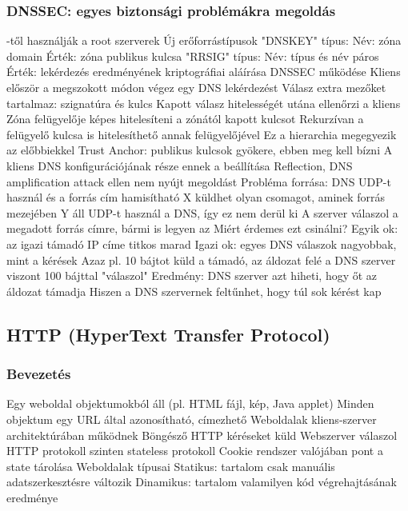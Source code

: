 \documentclass[12pt,a4paper]{article}
\begin{document}
\pagebreak

\subsubsection{DNSSEC: egyes biztonsági problémákra megoldás}

\begin{outline}
	-től használják a root szerverek
	\1 Új erőforrástípusok
		\2 "DNSKEY" típus:
			\3 Név: zóna domain
			\3 Érték: zóna publikus kulcsa
		\2 "RRSIG" típus:
			\3 Név: típus és név páros
			\3 Érték: lekérdezés eredményének kriptográfiai aláírása
	\1 DNSSEC működése
		\2 Kliens először a megszokott módon végez egy DNS lekérdezést
			\3 Válasz extra mezőket tartalmaz: szignatúra és kulcs
		\2 Kapott válasz hitelességét utána ellenőrzi a kliens
			\3 Zóna felügyelője képes hitelesíteni a zónától kapott kulcsot
			\3 Rekurzívan a felügyelő kulcsa is hitelesíthető annak felügyelőjével
			\3 Ez a hierarchia megegyezik az előbbiekkel
			\3 Trust Anchor: publikus kulcsok gyökere, ebben meg kell bízni
				\4 A kliens DNS konfigurációjának része ennek a beállítása
	\1 Reflection, DNS amplification attack ellen nem nyújt megoldást
		\2 Probléma forrása: DNS UDP-t használ és a forrás cím hamisítható
			\3 X küldhet olyan csomagot, aminek forrás mezejében Y áll
			\3 UDP-t használ a DNS, így ez nem derül ki
			\3 A szerver válaszol a megadott forrás címre, bármi is legyen az
		\2 Miért érdemes ezt csinálni?
			\3 Egyik ok: az igazi támadó IP címe titkos marad
			\3 Igazi ok: egyes DNS válaszok nagyobbak, mint a kérések
				\4 Azaz pl. 10 bájtot küld a támadó, az áldozat felé a DNS szerver viszont 100 bájttal "válaszol"
		\2 Eredmény: DNS szerver azt hiheti, hogy őt az áldozat támadja
			\3 Hiszen a DNS szervernek feltűnhet, hogy túl sok kérést kap
\end{outline}

\pagebreak

\subsection{HTTP (HyperText Transfer Protocol)}

\subsubsection{Bevezetés}

\begin{outline}
	\1 Egy weboldal objektumokból áll (pl. HTML fájl, kép, Java applet)
	\1 Minden objektum egy URL által azonosítható, címezhető
	\1 Weboldalak kliens-szerver architektúrában működnek
		\2 Böngésző HTTP kéréseket küld
		\2 Webszerver válaszol
	\1 HTTP protokoll szinten stateless protokoll
		\2 Cookie rendszer valójában pont a state tárolása
	\1 Weboldalak típusai
		\2 Statikus: tartalom csak manuális adatszerkesztésre változik
		\2 Dinamikus: tartalom valamilyen kód végrehajtásának eredménye
\end{outline}
\end{document}
